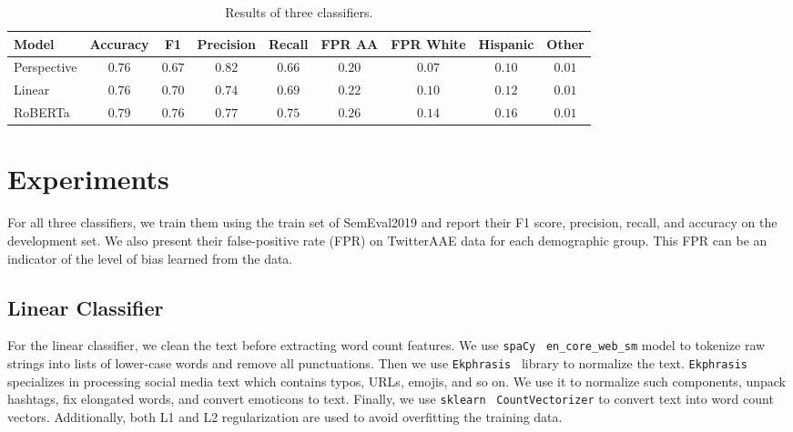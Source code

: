 \documentclass[11pt]{article}
\begin{document}
    \begin{table*}[t]
        \small
        \centering
        \begin{tabular}{lcccccccc}
            \hline
            Model       & Accuracy & F1     & Precision & Recall & FPR AA & FPR White & Hispanic & Other  \\
            \hline
            Perspective & $0.76$   & $0.67$ & $0.82$    & $0.66$ & $0.20$ & $0.07$    & $0.10$   & $0.01$ \\\hline
            Linear      & $0.76$   & $0.70$ & $0.74$    & $0.69$ & $0.22$ & $0.10$    & $0.12$   & $0.01$ \\\hline
            RoBERTa     & $0.79$   & $0.76$ & $0.77$    & $0.75$ & $0.26$ & $0.14$    & $0.16$   & $0.01$ \\\hline
        \end{tabular}

        \caption{Results of three classifiers.}
        \label{tab:results}
    \end{table*}


    \section{Experiments}

    For all three classifiers, we train them using the train set of SemEval2019 and report their F1 score,
    precision, recall, and accuracy on the development set.
    We also present their false-positive rate (FPR) on TwitterAAE data for each demographic group.
    This FPR can be an indicator of the level of bias learned from the data.

    \subsection{Linear Classifier}

    For the linear classifier, we clean the text before extracting word count features.
    We use \texttt{spaCy}~\cite{spacy} \texttt{en\_core\_web\_sm} model to tokenize raw strings into
    lists of lower-case words and remove all punctuations.
    Then we use \texttt{Ekphrasis}~\cite{ekphrasis} library to normalize the text.
    \texttt{Ekphrasis} specializes in processing social media text which contains typos, URLs, emojis, and so on.
    We use it to normalize such components, unpack hashtags, fix elongated words, and convert emoticons to text.
    Finally, we use \texttt{sklearn}~\cite{scikit-learn} \texttt{CountVectorizer} to convert text into word count
    vectors.
    Additionally, both L1 and L2 regularization are used to avoid overfitting the training data.
\end{document}
